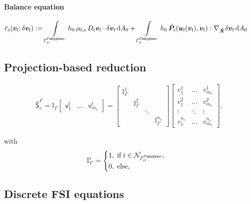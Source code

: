 \documentclass[a4paper,12pt]{report}
\newcommand{\fS}{\text{s}}
\newcommand{\fF}{\text{f}}
\newcommand{\bs}[1]{\boldsymbol{#1}}
\newcommand{\Gm}{\mathit{\Gamma}}
\newcommand{\rop}{r}
\newcommand{\vf}{\bs{v}_{\fF}} %
\newcommand{\uf}{\bs{u}_{\fF}} %
\newcommand{\vft}{\delta\vf} %
\begin{document}
\paragraph{Balance equation}

\begin{align}
    \tilde{\rop}_{\fS} (\vf; \vft) 
    & := 
    \int\limits_{\Gm_{0}^{\mathrm{\fF\mhyphen\fS}}} h_0\,\rho_{0,\fS}\,D_t \vf \cdot \vft \,\mathrm{d}A_0 
    + 
    \int\limits_{\Gm_{0}^{\mathrm{\fF\mhyphen\fS}}} h_0\,\tilde{\bs{P}}_{\fS}(\uf(\vf),\vf) : \nabla_{\tilde{\bs{X}}} \vft \,\mathrm{d}A_0
    \label{eq:fsi_solid_weakform_red}
\end{align}

\subsection{Projection-based reduction}

\begin{align}
    \hat{\bs{\mathsf{S}}}_{v}^{\Gm} = \pmb{\mathbb{I}}_{\Gm} \begin{bmatrix} \bs{\mathsf{v}}_{1}^{\fF} & \hdots & \bs{\mathsf{v}}_{m_v}^{\fF} \end{bmatrix} = \begin{bmatrix} \mathbb{I}_{\Gm}^{1} & & \\ & \mathbb{I}_{\Gm}^{2} & \\ & & \ddots & \\ & & & \mathbb{I}_{\Gm}^{n_v} \end{bmatrix} \begin{bmatrix} v_{1}^1 & \hdots & v_{m_v}^1 \\ v_{1}^2 & \hdots & v_{m_v}^2 \\ \vdots & \ddots & \vdots \\ v_{1}^{n_v} & \hdots & v_{m_v}^{n_v} \end{bmatrix}, \label{eq:snap_surf}
\end{align}

with 
\begin{align}
    \mathbb{I}_{\Gm}^{i} = \begin{cases} 1,\;\text{if}\;{i} \in \mathcal{N}_{\Gm_{0}^{\mathrm{\fF\mhyphen\fS}}}, \\ 0,\;\text{else},\end{cases} \label{eq:surf_indicative}
\end{align}

\subsection{Discrete FSI equations}
\end{document}
